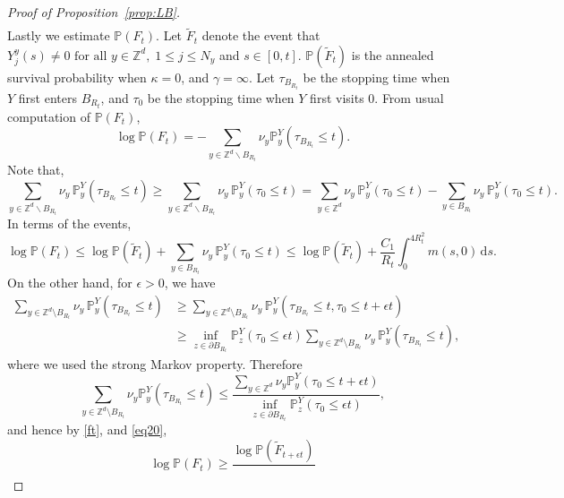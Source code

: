 \documentclass{article}[12pt]
\theoremstyle{definition}
\newcommand{\Z}{\mathbb{Z}}
\newcommand{\pr}{\mathbb{P}}
\newcommand{\1}{\mathbbm{1}}
\newcommand{\dd }{\mathrm{d} }
\begin{document}
\begin{proof}[Proof of Proposition~\ref{prop:LB}]
\begin{align}
\end{align}
Lastly we estimate $\mathbb{P}(F_t)$.
Let $\tilde{F}_t$ denote the event that  $Y^y_j(s) \neq 0 \text{ for all } y\in \Z^d,\; 1\le j\le N_y$ and $s\in [0,t]$.  $\mathbb{P}(\tilde{F}_t)$ is the annealed survival probability when $\kappa = 0$, and $\gamma = \infty$. Let $\tau_{B_{R_t}}$ be the stopping time when $Y$ first enters $B_{R_t}$, and $\tau_0$ be the stopping time when $Y$ first visits $0$. From usual computation of $\mathbb{P}(F_t)$,
\begin{equation}
    \log \mathbb{P}(F_t) = - \sum_{y\in \Z^d \backslash B_{R_t}}\nu_y\mathbb{P}^Y_y(\tau_{B_{R_t}}\le t).
    \label{ft}
\end{equation}
Note that,
\begin{equation}
    \sum_{y\in \Z^d \backslash B_{R_t}}\nu_y \,\mathbb{P}^Y_y(\tau_{B_{R_t}}\le t) \ge \sum_{y\in \Z^d \backslash B_{R_t}}\nu_y\, \mathbb{P}^Y_y(\tau_{0}\le t) = \sum_{y\in \Z^d}\nu_y\,\mathbb{P}^Y_y(\tau_{0}\le t) - \sum_{y\in B_{R_t}}\nu_y\,\mathbb{P}^Y_y(\tau_{0}\le t).
\end{equation}
In terms of the events, 
\begin{equation}
   \log \pr(F_t)\le \log\pr(\tilde{F}_t) + \sum_{y\in B_{R_t}}\nu_y\,\mathbb{P}^Y_y(\tau_{0}\le t) \le \log\pr(\tilde{F}_t) + \frac{C_1}{R_t}\int_0^{4R_t^2} m(s,0)\,\dd s.
\end{equation}
On the other hand, for $\epsilon > 0$, we have
\begin{align*}
\sum_{y \in \mathbb{Z}^d \setminus B_{R_t}} \nu_y\,\mathbb{P}^Y_y(\tau_{B_{R_t}} \leq t) &\geq
\sum_{y \in \mathbb{Z}^d \setminus B_{R_t}}\nu_y\, \mathbb{P}^Y_y(\tau_{B_{R_t}} \leq t, \tau_0 \leq t + \epsilon t) \\
&\geq
\inf_{z \in \partial B_{R_t}} \mathbb{P}^Y_z(\tau_0 \leq \epsilon t) \sum_{y \in \mathbb{Z}^d \setminus B_{R_t}} \nu_y\, \mathbb{P}^Y_y(\tau_{B_{R_t}} \leq t),
\end{align*}
where we used the strong Markov property. Therefore
\begin{equation}
\sum_{y \in \mathbb{Z}^d \setminus B_{R_t}}\nu_y \mathbb{P}^Y_y(\tau_{B_{R_t}} \leq t) \leq
\frac{\sum_{y \in \mathbb{Z}^d} \nu_y \mathbb{P}^Y_y(\tau_0 \leq t + \epsilon t)}{
\inf_{z \in \partial B_{R_t}} \mathbb{P}^Y_z(\tau_0 \leq \epsilon t)},
\label{eq20}
\end{equation}
and hence by \eqref{ft},  and \eqref{eq20},
\begin{equation}
\log \mathbb{P}(F_t) \ge \frac{\log \mathbb{P}(\tilde{F}_{t + \epsilon t})}{
}
\end{equation}
\end{proof}
\end{document}

